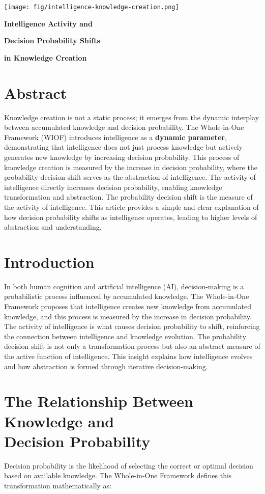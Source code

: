 \documentclass{article}
\newcommand{\bn}{\bigskip\noindent}
\newcommand{\mn}{\medskip\noindent}
\begin{document}
\begin{center}
\texttt{[image: fig/intelligence-knowledge-creation.png]}
\end{center}

\mn
{\huge\bf Intelligence Activity and }

\bn
{\huge\bf Decision Probability Shifts }

\bn
{\huge\bf in Knowledge Creation}


\section*{Abstract}
Knowledge creation is not a static process; it emerges from the dynamic interplay between accumulated knowledge and decision probability. The Whole-in-One Framework (WIOF) introduces intelligence as a {\bf dynamic parameter}, demonstrating that intelligence does not just process knowledge but actively generates new knowledge by increasing decision probability. This process of knowledge creation is measured by the increase in decision probability, where the probability decision shift serves as the abstraction of intelligence. The activity of intelligence directly increases decision probability, enabling knowledge transformation and abstraction. The probability decision shift is the measure of the activity of intelligence. This article provides a simple and clear explanation of how decision probability shifts as intelligence operates, leading to higher levels of abstraction and understanding.

\section{Introduction}
In both human cognition and artificial intelligence (AI), decision-making is a probabilistic process influenced by accumulated knowledge. The Whole-in-One Framework proposes that intelligence creates new knowledge from accumulated knowledge, and this process is measured by the increase in decision probability. The activity of intelligence is what causes decision probability to shift, reinforcing the connection between intelligence and knowledge evolution. The probability decision shift is not only a transformation process but also an abstract measure of the active function of intelligence. This insight explains how intelligence evolves and how abstraction is formed through iterative decision-making.

\section{The Relationship Between Knowledge and\\ Decision Probability}
Decision probability is the likelihood of selecting the correct or optimal decision based on available knowledge. The Whole-in-One Framework defines this transformation mathematically as:
\end{document}
